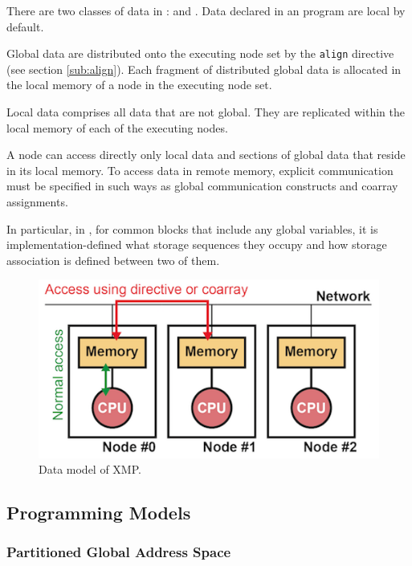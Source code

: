 There are two classes of data in {\XMP}: {\it {}} and
{\it {}}. Data declared in an {\XMP} program are local by
default.

Global data are distributed onto the executing node set by
the {\tt align} directive (see section \ref{sub:align}). Each fragment
of distributed global data is allocated in the local memory of a node in the
executing node set.

Local data comprises all data that are not global. They are replicated
within the local memory of each of the executing nodes.

A node can access directly only local data and sections of global data
that reside in its local memory.
%
To access data in remote memory, explicit communication must be
specified in such ways as global communication constructs and
coarray assignments.

In particular, in {\XMPF}, for common blocks that include any global
variables, it is implementation-defined what storage sequences they
occupy and how storage association is defined between two of them.

\begin{figure}
  \centering
  \includegraphics{figs/architecture.png}
  \caption{Data model of XMP.}\label{fig:data_model}
\end{figure}


\subsection{Programming Models}

\subsubsection{Partitioned Global Address Space}

